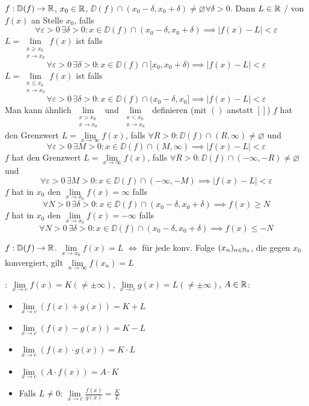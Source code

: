 \Def $f: \mathbb{D}(f) \to \mathbb{R}$, $x_0 \in \mathbb{R}$, $\DD(f) \cap (x_0 - \delta, x_0 + \delta)\ne \varnothing \forall \delta > 0$.
Dann $L \in \mathbb{R}$ / von $f(x)$ an Stelle $x_0$, falls
$$\forall \varepsilon > 0 \, \exists \delta > 0 : x \in \DD(f) \cap (x_0 - \delta, x_0 + \delta) \implies |f(x) - L| < \varepsilon$$
$L = \lim\limits_{\substack{x\ge x_0 \\ x \to x_0}} f(x)$ ist  falls
$$\forall \varepsilon > 0 \, \exists \delta > 0 : x \in \DD(f) \cap [x_0, x_0 + \delta) \implies |f(x) - L| < \varepsilon$$
$L = \lim\limits_{\substack{x\le x_0 \\ x \to x_0}} f(x)$ ist  falls
$$\forall \varepsilon > 0 \, \exists \delta > 0 : x \in \DD(f) \cap (x_0 - \delta, x_0] \implies |f(x) - L| < \varepsilon$$
Man kann ähnlich $\lim\limits_{\substack{x > x_0 \\ x \to x_0}}$ und $\lim\limits_{\substack{x < x_0 \\ x \to x_0}}$
definieren (mit $()$ anstatt $[]$)
$f$ hat  den Grenzwert $L = \lim\limits_{x\to\infty}f(x)$, falls $\forall R > 0 : \DD(f) \cap (R, \infty) \ne \varnothing$ und
$$\forall \varepsilon > 0 \, \exists M > 0 : x \in \DD(f) \cap (M, \infty) \implies |f(x) - L| < \varepsilon$$
$f$ hat  den Grenzwert $L = \lim\limits_{x\to\infty}f(x)$, falls $\forall R > 0 : \DD(f) \cap (-\infty, -R) \ne \varnothing$ und
$$\forall \varepsilon > 0 \, \exists M > 0 : x \in \DD(f) \cap (-\infty, -M) \implies |f(x) - L| < \varepsilon$$
$f$ hat in $x_0$ den  $\lim\limits_{x \to x_0}f(x) = \infty$ falls
$$\forall N > 0 \, \exists \delta > 0 : x \in \DD(f) \cap (x_0 - \delta, x_0 + \delta) \implies f(x) \ge N$$
$f$ hat in $x_0$ den  $\lim\limits_{x \to x_0}f(x) = -\infty$ falls
$$\forall N > 0 \, \exists \delta > 0 : x \in \DD(f) \cap (x_0 - \delta, x_0 + \delta) \implies f(x) \le -N$$

\Satz $f: \mathbb{D}(f) \to \mathbb{R}$. $\lim\limits_{x \to x_0} f(x) = L$ $\iff$ für jede konv. Folge $(x_n)_{n \in \mathbb{N}_0}$,
die gegen $x_0$ konvergiert, gilt $\lim\limits_{n\to\infty} f(x_n) = L$

\Satz {}: $\lim\limits_{x\to c} f(x) = K (\ne \pm \infty)$, $\lim\limits_{x\to c}g(x) = L (\ne \pm \infty)$, $A \in \mathbb{R}$:
\vspace{-0.6em}
\begin{itemize}
    \item $\lim\limits_{x\to c}(f(x) + g(x)) = K + L$
    \item $\lim\limits_{x\to c}(f(x) - g(x)) = K - L$
    \item $\lim\limits_{x\to c}(f(x) \cdot g(x)) = K \cdot L$
    \item $\lim\limits_{x\to c}(A \cdot f(x)) = A \cdot K$
    \item Falls $L \ne 0$: $\lim\limits_{x\to c}\frac{f(x)}{g(x)} = \frac{K}{L}$
\end{itemize}


